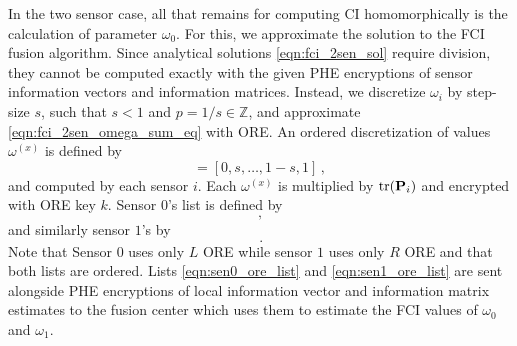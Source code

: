 \documentclass[letterpaper, 10 pt, conference]{ieeeconf}  %
\begin{document}
In the two sensor case, all that remains for computing CI homomorphically is the calculation of parameter $\omega_0$. For this, we approximate the solution to the FCI fusion algorithm. Since analytical solutions \eqref{eqn:fci_2sen_sol} require division, they cannot be computed exactly with the given PHE encryptions of sensor information vectors and information matrices. Instead, we discretize $\omega_i$ by step-size $s$, such that $s<1$ and $p=1/s \in \mathbb{Z}$, and approximate \eqref{eqn:fci_2sen_omega_sum_eq} with ORE. An ordered discretization of values $\omega^{(x)}$ is defined by
\begin{equation}
   [\omega^{(0)},\dots,\omega^{(p)}] = [0,s,\dots,1-s,1]\,,
\end{equation}
and computed by each sensor $i$. Each $\omega^{(x)}$ is multiplied by $\operatorname{tr}({{\mathbf{P}}}_i)$ and encrypted with ORE key $k$. Sensor $0$'s list is defined by 
\begin{equation}
   [\mathcal{E}^L_{ORE}(\omega^{(0)}\tr(\mP_0)),\dots,\mathcal{E}^L_{ORE}(\omega^{(p)}\tr(\mP_0))]\,, \label{eqn:sen0_ore_list}
\end{equation}
and similarly sensor $1$'s by
\begin{equation}
   [\mathcal{E}^R_{ORE}(\omega^{(0)}\tr(\mP_1)),\dots,\mathcal{E}^R_{ORE}(\omega^{(p)}\tr(\mP_1))]\,. \label{eqn:sen1_ore_list}
\end{equation}
Note that Sensor $0$ uses only $L$ ORE while sensor $1$ uses only $R$ ORE and that both lists are ordered. Lists \eqref{eqn:sen0_ore_list} and \eqref{eqn:sen1_ore_list} are sent alongside PHE encryptions of local information vector and information matrix estimates to the fusion center which uses them to estimate the FCI values of $\omega_0$ and $\omega_1$.
\end{document}

